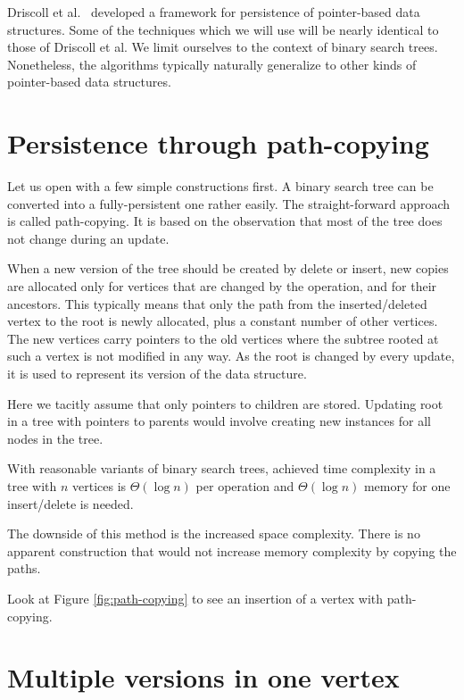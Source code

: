 Driscoll et al.~\cite{persistence-DSST} developed a framework for persistence of pointer-based data structures. 
Some of the techniques which we will use will be nearly identical to those of Driscoll et al.
We limit ourselves to the context of binary search trees. 
Nonetheless, the algorithms typically naturally generalize to other kinds of pointer-based data structures.

\section{Persistence through path-copying}

Let us open with a few simple constructions first. A binary search tree can be converted into a fully-persistent one rather easily.
The straight-forward approach is called path-copying. It is based on the observation that most of the tree does not change during an update.

When a new version of the tree should be created by delete or insert, new copies are allocated only for vertices that are changed by the operation, and for their ancestors. 
This typically means that only the path from the inserted/deleted vertex to the root is newly allocated, plus a constant number of other vertices. 
The new vertices carry pointers to the old vertices where the subtree rooted at such a vertex is not modified in any way.
As the root is changed by every update, it is used to represent its version of the data structure.

Here we tacitly assume that only pointers to children are stored. 
Updating root in a tree with pointers to parents would involve creating new instances for all nodes in the tree.

With reasonable variants of binary search trees, achieved time complexity in a tree with $n$ vertices is $\Theta(\log n)$ per operation and $\Theta(\log n)$ memory for one insert/delete is needed.

The downside of this method is the increased space complexity. 
There is no apparent construction that would not increase memory complexity by copying the paths.

Look at Figure \ref{fig:path-copying} to see an insertion of a vertex with path-copying.



\section{Multiple versions in one vertex}

